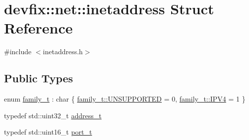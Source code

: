 \hypertarget{structdevfix_1_1net_1_1inetaddress}{}\section{devfix\+:\+:net\+:\+:inetaddress Struct Reference}
\label{structdevfix_1_1net_1_1inetaddress}


{\ttfamily \#include $<$inetaddress.\+h$>$}

\subsection*{Public Types}
\begin{DoxyCompactItemize}
\item 
enum \hyperlink{structdevfix_1_1net_1_1inetaddress_a1c470962b4c9c675d475dba2344b50f4}{family\+\_\+t} \+: char \{ \hyperlink{structdevfix_1_1net_1_1inetaddress_a1c470962b4c9c675d475dba2344b50f4a40aa75f8e8cfdf7b660c5620e953229f}{family\+\_\+t\+::\+U\+N\+S\+U\+P\+P\+O\+R\+T\+ED} = 0, 
\hyperlink{structdevfix_1_1net_1_1inetaddress_a1c470962b4c9c675d475dba2344b50f4ae638ca944d27f97f46a5986a5aa53434}{family\+\_\+t\+::\+I\+P\+V4} = 1
 \}
\item 
typedef std\+::uint32\+\_\+t \hyperlink{structdevfix_1_1net_1_1inetaddress_a2eb252de4b894131be8fcda68118bd77}{address\+\_\+t}
\item 
typedef std\+::uint16\+\_\+t \hyperlink{structdevfix_1_1net_1_1inetaddress_a3eaadc730f2b4625987cf948ea485410}{port\+\_\+t}
\end{DoxyCompactItemize}
